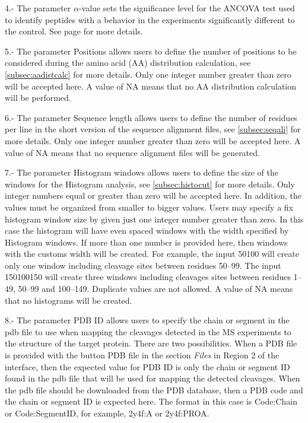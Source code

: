 \num{4}.- The parameter $\alpha$-value sets the significance level for the ANCOVA test used to identify peptides with a behavior in the experiments significantly different to the control. See page \pageref{par:ancovatest} for more details.

\num{5}.- The parameter Positions\label{par:enzdigPos} allows users to define the number of positions to be considered during the amino acid (AA) distribution calculation, see \autoref{subsec:aadistcalc} for more details. Only one integer number greater than zero will be accepted here. A value of NA means that no AA distribution calculation will be performed. 

\num{6}.- The parameter Sequence length\label{par:enzdigSeqL} allows users to define the number of residues per line in the short version of the sequence alignment files, see \autoref{subsec:seqali} for more details. Only one integer number greater than zero will be accepted here. A value of NA means that no sequence alignment files will be generated.

\num{7}.- The parameter Histogram windows\label{par:enzdigHist} allows users to define the size of the windows for the Histogram analysis, see \autoref{subsec:histocut} for more details. Only integer numbers equal or greater than zero will be accepted here. In addition, the values must be organized from smaller to bigger values. Users may specify a fix histogram window size by given just one integer number greater than zero. In this case the histogram will have even spaced windows with the width specified by Histogram windows. If more than one number is provided here, then windows with the customs width will be created. For example, the input \numlist{50 100} will create only one window including cleavage sites between residues \numrange{50}{99}. The input \numlist{1 50 100 150} will create three windows including cleavages sites between residues \numrange{1}{49}, \numrange{50}{99} and \numrange{100}{149}. Duplicate values are not allowed. A value of NA means that no histograms will be created.

\num{8}.- The parameter PDB ID\label{par:pdbID} allows users to specify the chain or segment in the pdb file to use when mapping the cleavages detected in the MS experiments to the structure of the target protein. There are two possibilities. When a PDB file is provided with the button PDB file in the section \textit{Files} in Region \num{2} of the interface, then the expected value for PDB ID is only the chain or segment ID found in the pdb file that will be used for mapping the detected cleavages. When the pdb file should be downloaded from the PDB database, then a PDB code and the chain or segment ID is expected here. The format in this case is Code:Chain or Code:SegmentID, for example, 2y4f:A or 2y4f:PROA. 

